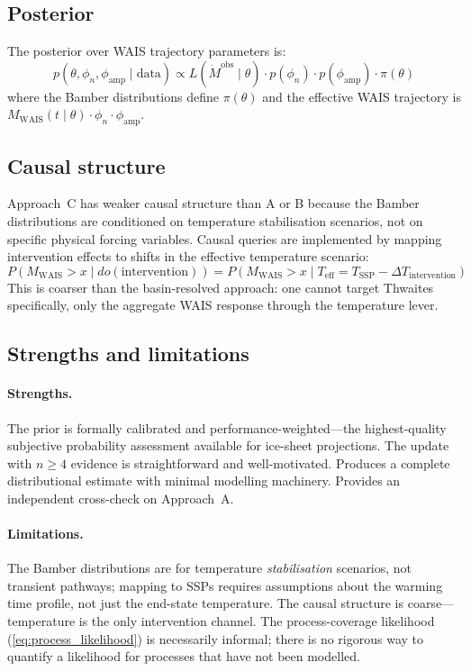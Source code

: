 \documentclass[11pt]{article}
\newcommand{\WAIS}{\text{WAIS}}
\begin{document}
\subsection{Posterior}

The posterior over WAIS trajectory parameters is:
\begin{equation}
  p(\theta, \phi_n, \phi_{\text{amp}} \mid \text{data})
    \propto L(\dot{M}^{\text{obs}} \mid \theta) \cdot p(\phi_n) \cdot p(\phi_{\text{amp}}) \cdot \pi(\theta)
  \label{eq:posterior_c}
\end{equation}
where the Bamber distributions define $\pi(\theta)$ and the effective WAIS trajectory is $M_{\WAIS}(t \mid \theta) \cdot \phi_n \cdot \phi_{\text{amp}}$.

\subsection{Causal structure}

Approach~C has weaker causal structure than A or B because the Bamber distributions are conditioned on temperature stabilisation scenarios, not on specific physical forcing variables.  Causal queries are implemented by mapping intervention effects to shifts in the effective temperature scenario:
\begin{equation}
  P\!\left(M_{\WAIS} > x \mid do(\text{intervention})\right)
  = P\!\left(M_{\WAIS} > x \mid T_{\text{eff}} = T_{\text{SSP}} - \Delta T_{\text{intervention}}\right)
\end{equation}
This is coarser than the basin-resolved approach: one cannot target Thwaites specifically, only the aggregate WAIS response through the temperature lever.

\subsection{Strengths and limitations}

\paragraph{Strengths.}  The prior is formally calibrated and performance-weighted---the highest-quality subjective probability assessment available for ice-sheet projections.  The update with $n \geq 4$ evidence is straightforward and well-motivated.  Produces a complete distributional estimate with minimal modelling machinery.  Provides an independent cross-check on Approach~A.

\paragraph{Limitations.}  The Bamber distributions are for temperature \emph{stabilisation} scenarios, not transient pathways; mapping to SSPs requires assumptions about the warming time profile, not just the end-state temperature.  The causal structure is coarse---temperature is the only intervention channel.  The process-coverage likelihood (\cref{eq:process_likelihood}) is necessarily informal; there is no rigorous way to quantify a likelihood for processes that have not been modelled.
\end{document}
